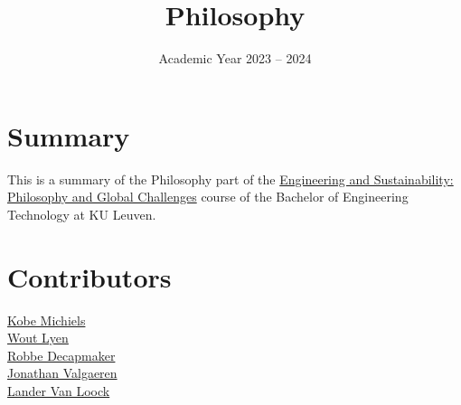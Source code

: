 \documentclass[kul]{kulakarticle} %
\title{Philosophy}
\author{}
\date{Academic Year 2023 -- 2024}
\begin{document}
	
	\maketitle
	
	\section*{Summary}
	
	This is a summary of the Philosophy part of the \href{https://onderwijsaanbod.kuleuven.be/syllabi/v/e/T3AID1E.htm#activetab=inhoud_idp1690064}{Engineering and Sustainability: Philosophy and Global Challenges} course of the Bachelor of Engineering Technology at KU Leuven.
	
	\section*{Contributors}
	\href{https://github.com/michielskobe}{Kobe Michiels}\\
	\href{https://github.com/woutlyen}{Wout Lyen}\\
	\href{https://github.com/debber1}{Robbe Decapmaker}\\
	\href{https://github.com/ItsAlphie}{Jonathan Valgaeren}\\
	\href{https://github.com/Lander0606}{Lander Van Loock}

	\setcounter{tocdepth}{2}
	\tableofcontents
	
	\newpage
	
	\newpage
	
	\newpage
	
	\newpage
	
	\newpage
	
	
\end{document}
